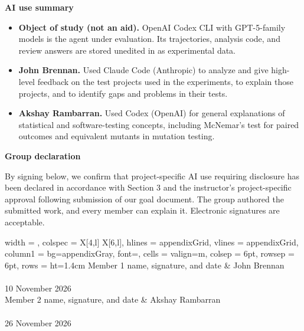\noindent
\textbf{AI use summary}
\par\nopagebreak\smallskip

\begingroup
\RaggedRight
\begin{itemize}
	\item \textbf{Object of study (not an aid).} OpenAI Codex CLI with
	GPT-5-family models is the agent under evaluation. Its trajectories,
	analysis code, and review answers are stored unedited in 
	as experimental data.
	\item \textbf{John Brennan.} Used Claude Code (Anthropic) to analyze
	and give high-level feedback on the test projects used in the
	experiments, to explain those projects, and to identify gaps and
	problems in their tests.
	\item \textbf{Akshay Rambarran.} Used Codex (OpenAI) for general
	explanations of statistical and software-testing concepts, including
	McNemar's test for paired outcomes and equivalent mutants in mutation testing.
\end{itemize}
\endgroup

\noindent
\textbf{Group declaration}
\par\nopagebreak\smallskip

\noindent
By signing below, we confirm that project-specific AI use requiring disclosure
has been declared in accordance with Section 3 and the instructor's
project-specific approval following submission of our goal document.
The group authored the submitted work, and every member can explain it.
Electronic signatures are acceptable.

\par\medskip

\noindent
\begin{tblr}{
		width = \linewidth,
		colspec = {X[4,l] X[6,l]},
		hlines = {appendixGrid},
		vlines = {appendixGrid},
		column{1} = {bg=appendixGray, font=\bfseries},
		cells = {valign=m},
		colsep = 6pt,
		rowsep = 6pt,
		rows = {ht=1.4cm}
	}
	Member 1 name, signature, and date
	&
	{John Brennan \\  \\ 10 November 2026}
	\\
	Member 2 name, signature, and date
	&
	{Akshay Rambarran \\  \\ 26 November 2026}
	\\
\end{tblr}

\clearpage

